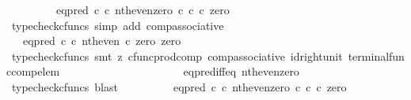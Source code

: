 \begin{isabellebody}
\ \ \ \ \ \ \ \ {\isacharequal}{\kern0pt}\ eq{\isacharunderscore}{\kern0pt}pred\ {\isasymnat}\isactrlsub c\ {\isasymcirc}\isactrlsub c\ {\isasymlangle}nth{\isacharunderscore}{\kern0pt}even{\isacharcomma}{\kern0pt}zero\ {\isasymcirc}\isactrlsub c\ {\isasymbeta}\isactrlbsub {\isasymnat}\isactrlsub c\isactrlesub {\isasymrangle}\ {\isasymcirc}\isactrlsub c\ zero{\isachardoublequoteclose}\isanewline
\ \ \ \ \ \ \ \ \isamarkupfalse%
\ {\isacharparenleft}{\kern0pt}typecheck{\isacharunderscore}{\kern0pt}cfuncs{\isacharcomma}{\kern0pt}\ simp\ add{\isacharcolon}{\kern0pt}\ comp{\isacharunderscore}{\kern0pt}associative{}{\isacharparenright}{\kern0pt}\isanewline
\ \ \ \ \ \ \isamarkupfalse%
\ \isamarkupfalse%
\ {\isachardoublequoteopen}{\isachardot}{\kern0pt}{\isachardot}{\kern0pt}{\isachardot}{\kern0pt}\ {\isacharequal}{\kern0pt}\ eq{\isacharunderscore}{\kern0pt}pred\ {\isasymnat}\isactrlsub c\ {\isasymcirc}\isactrlsub c\ {\isasymlangle}nth{\isacharunderscore}{\kern0pt}even\ {\isasymcirc}\isactrlsub c\ zero{\isacharcomma}{\kern0pt}\ zero{\isasymrangle}{\isachardoublequoteclose}\isanewline
\ \ \ \ \ \ \ \ \isamarkupfalse%
\ {\isacharparenleft}{\kern0pt}typecheck{\isacharunderscore}{\kern0pt}cfuncs{\isacharcomma}{\kern0pt}\ smt\ {\isacharparenleft}{\kern0pt}z{}{\isacharparenright}{\kern0pt}\ cfunc{\isacharunderscore}{\kern0pt}prod{\isacharunderscore}{\kern0pt}comp\ comp{\isacharunderscore}{\kern0pt}associative{}\ id{\isacharunderscore}{\kern0pt}right{\isacharunderscore}{\kern0pt}unit{}\ terminal{\isacharunderscore}{\kern0pt}func{\isacharunderscore}{\kern0pt}comp{\isacharunderscore}{\kern0pt}elem{\isacharparenright}{\kern0pt}\isanewline
\ \ \ \ \ \ \isamarkupfalse%
\ \isamarkupfalse%
\ {\isachardoublequoteopen}{\isachardot}{\kern0pt}{\isachardot}{\kern0pt}{\isachardot}{\kern0pt}\ {\isacharequal}{\kern0pt}\ {\isasymt}{\isachardoublequoteclose}\isanewline
\ \ \ \ \ \ \ \ \isamarkupfalse%
\ eq{\isacharunderscore}{\kern0pt}pred{\isacharunderscore}{\kern0pt}iff{\isacharunderscore}{\kern0pt}eq\ nth{\isacharunderscore}{\kern0pt}even{\isacharunderscore}{\kern0pt}zero\ \isamarkupfalse%
\ {\isacharparenleft}{\kern0pt}typecheck{\isacharunderscore}{\kern0pt}cfuncs{\isacharcomma}{\kern0pt}\ blast{\isacharparenright}{\kern0pt}\isanewline
\ \ \ \ \ \ \isamarkupfalse%
\ \isamarkupfalse%
\ {\isachardoublequoteopen}{\isacharparenleft}{\kern0pt}eq{\isacharunderscore}{\kern0pt}pred\ {\isasymnat}\isactrlsub c\ {\isasymcirc}\isactrlsub c\ {\isasymlangle}nth{\isacharunderscore}{\kern0pt}even{\isacharcomma}{\kern0pt}zero\ {\isasymcirc}\isactrlsub c\ {\isasymbeta}\isactrlbsub {\isasymnat}\isactrlsub c\isactrlesub {\isasymrangle}{\isacharparenright}{\kern0pt}\ {\isasymcirc}\isactrlsub c\ zero\ {\isacharequal}{\kern0pt}\ {\isasymt}{\isachardoublequoteclose}\isanewline

\end{isabellebody}
